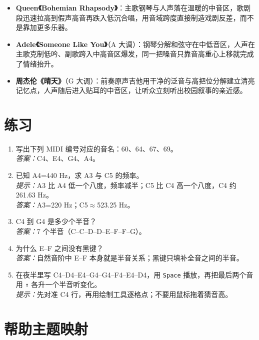 \begin{itemize}
  \item \textbf{Queen《Bohemian Rhapsody》}：主歌钢琴与人声落在温暖的中音区，歌剧段迅速拉高到假声高音再跌入低沉合唱，用音域跨度直接制造戏剧反差，而不是靠加更多乐器。
  \item \textbf{Adele《Someone Like You》}（A 大调）：钢琴分解和弦守在中低音区，人声在主歌克制低吟、副歌跨入中高音区爆发，同一把嗓音只靠音高重心上移就完成了情绪抬升。
  \item \textbf{周杰伦《晴天》}（G 大调）：前奏原声吉他用干净的泛音与高把位分解建立清亮记忆点，人声随后进入贴耳的中音区，让听众立刻听出校园叙事的亲近感。
\end{itemize}

\section{练习}


\begin{exercise}
\begin{enumerate}
  \item 写出下列 MIDI 编号对应的音名：60、64、67、69。\\
  \emph{答案：}C4、E4、G4、A4。
  \item 已知 A4=440 Hz，求 A3 与 C5 的频率。\\
  \emph{提示：}A3 比 A4 低一个八度，频率减半；C5 比 C4 高一个八度，C4 约 261.63 Hz。\\
  \emph{答案：}A3=220 Hz；C5\ensuremath{\approx}523.25 Hz。
  \item C4 到 G4 是多少个半音？\\
  \emph{答案：}7 个半音（C–C\sharpsym–D–D\sharpsym–E–F–F\sharpsym–G）。
  \item 为什么 E–F 之间没有黑键？\\
  \emph{答案：}自然音阶中 E–F 本身就是半音关系；黑键只填补全音之间的半音。
  \item 在夜半里写 C4–D4–E4–G4–G4–F4–E4–D4，用 \texttt{Space} 播放，再把最后两个音用 \texttt{↑} 各升一个半音听变化。\\
  \emph{提示：}先对准 C4 行，再用绘制工具逐格点；不要用鼠标拖着猜音高。
\end{enumerate}
\end{exercise}

\section{帮助主题映射}

